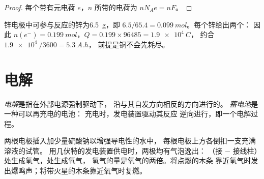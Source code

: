 \begin{proof}
每个带有元电荷 $e$，$n$ 
所带的电荷为 $n N_A e = n F$。
\end{proof}

\begin{example}[丹尼尔电池的电量]\label{ex:g12:cells-and-electrolysis:capacity}
锌电极中可参与反应的锌为\qty{6.5}{g}，即
$6.5/65.4 = \qty{0.099}{mol}$。每个锌给出两个：
因此 $n(e^-) = \qty{0.199}{mol}$，$Q = 0.199 \times 96485 = \qty{1.9e4}{C}$，
约合 $\qty{1.9e4}{}/3600 = \qty{5.3}{A.h}$，
前提是铜不会先耗尽。
\end{example}

\section{电解}

\begin{definition}[电解，蓄电池]\label{def:g12:cells-and-electrolysis:electrolysis}
\emph{电解}是指在外部电源强制驱动下，
沿与其自发方向相反的方向进行的。
\emph{蓄电池}是一种可以再充电的电池：
充电时，发电装置驱动其反应
逆向进行，即一个电解过程。
\end{definition}

\begin{inthelab}[电解水]
两根电极插入加少量硫酸钠以增强导电性的水中，
每根电极上方各倒扣一支充满溶液的试管。
用几伏特的发电装置供电时，两极均有气泡逸出：
（接 $-$ 接线柱）处生成氢气，处生成氧气，
氢气的量是氧气的两倍。将点燃的木条
靠近氢气时发出爆鸣声；将带火星的木条靠近氧气时复燃。
\end{inthelab}

